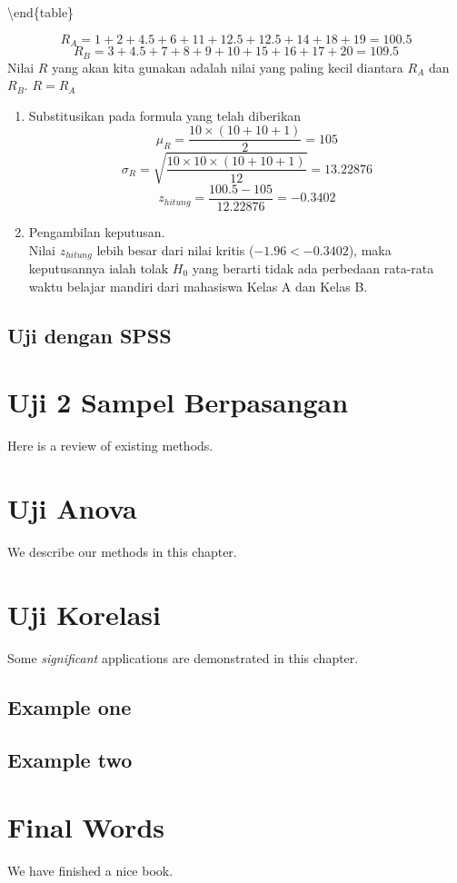 \documentclass[
]{book}
\begin{document}
\textbackslash end\{table\}

\[
R_A = 1+2+4.5+6+11+12.5+12.5+14+18+19=100.5
\]
\[
R_B = 3+4.5+7+8+9+10+15+16+17+20=109.5
\]
Nilai \(R\) yang akan kita gunakan adalah nilai yang paling kecil diantara \(R_A\) dan \(R_B\). \(R = R_A\)

\begin{enumerate}
\def\labelenumi{\arabic{enumi}.}
\setcounter{enumi}{3}
\item
  Substitusikan pada formula yang telah diberikan
  \[\mu_R=\frac{10 \times (10+10+1)}{2}=105\]
  \[\sigma_R=\sqrt{\frac{10 \times 10 \times (10+10+1)}{12}}=13.22876\]
  \[
  z_{hitung} = \frac{100.5-105}{12.22876}=-0.3402
  \]
\item
  Pengambilan keputusan.\\
  Nilai \(z_{hitung}\) lebih besar dari nilai kritis (\(-1.96<-0.3402\)), maka keputusannya ialah tolak \(H_0\) yang berarti tidak ada perbedaan rata-rata waktu belajar mandiri dari mahasiswa Kelas A dan Kelas B.
\end{enumerate}

\hypertarget{uji-dengan-spss}{%
\section{Uji dengan SPSS}\label{uji-dengan-spss}}

\hypertarget{uji-2-sampel-berpasangan}{%
\chapter{Uji 2 Sampel Berpasangan}\label{uji-2-sampel-berpasangan}}

Here is a review of existing methods.

\hypertarget{uji-anova}{%
\chapter{Uji Anova}\label{uji-anova}}

We describe our methods in this chapter.

\hypertarget{uji-korelasi}{%
\chapter{Uji Korelasi}\label{uji-korelasi}}

Some \emph{significant} applications are demonstrated in this chapter.

\hypertarget{example-one}{%
\section{Example one}\label{example-one}}

\hypertarget{example-two}{%
\section{Example two}\label{example-two}}

\hypertarget{final-words}{%
\chapter{Final Words}\label{final-words}}

We have finished a nice book.

  
\end{document}
